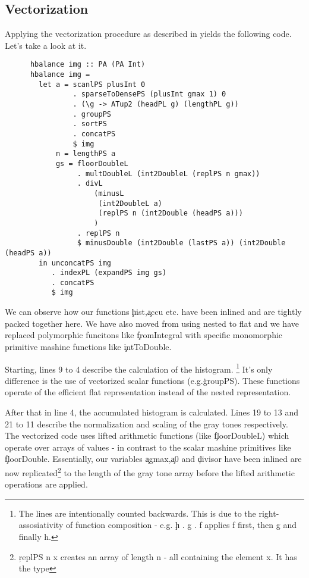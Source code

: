     \subsection{Vectorization}
      Applying the vectorization procedure as described in \cite{Harness2008} yields the following code. Let's take a look  at it.
      
      \begin{lstlisting}
      hbalance img :: PA (PA Int)
      hbalance img = 
        let a = scanlPS plusInt 0
                . sparseToDensePS (plusInt gmax 1) 0
                . (\g -> ATup2 (headPL g) (lengthPL g))
                . groupPS
                . sortPS
                . concatPS
                $ img
            n = lengthPS a
            gs = floorDoubleL
                 . multDoubleL (int2DoubleL (replPS n gmax))
                 . divL
                     (minusL
                      (int2DoubleL a)
                      (replPS n (int2Double (headPS a)))
                     )
                 . replPS n
                 $ minusDouble (int2Double (lastPS a)) (int2Double (headPS a))
        in unconcatPS img
           . indexPL (expandPS img gs)
           . concatPS
           $ img
      \end{lstlisting}
      We can observe how our functions \c{hist},\c{accu} etc. have been inlined and are tightly packed together here.
      We have also moved from using nested \pan to flat \pav and we have replaced polymorphic funcitons like \c{fromIntegral}
      with specific monomorphic primitive mashine functions like \c{intToDouble}.
      
      Starting, lines 9 to 4 describe the calculation of the histogram.
      \footnote[1]{The lines are intentionally counted backwards. This is due to the right-assosiativity of function composition - e.g. \c{h . g . f} applies f first, then g and finally h.}
      It's only difference is the use of vectorized scalar functions (e.g.\c{groupPS}). These functions operate of the efficient flat
      representation instead of the nested representation.
      
      
      After that in line 4, the accumulated histogram is calculated. Lines 19 to 13 and 21 to 11
      describe the normalization and scaling of the gray tones respectively. The vectorized code uses
      lifted arithmetic functions (like \c{floorDoubleL}) which operate over arrays of values - in contrast to
      the scalar mashine primitives like \c{floorDouble}. Essentially, our variables \c{agmax},\c{a0} and \c{divisor}
      have been inlined are now replicated\footnote[2]{\c{replPS n x} creates an array of length n - all containing the element x. It has the type }
      to the length of the gray tone array before the lifted arithmetic operations are applied.
      
